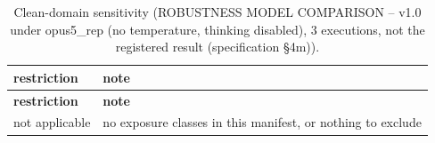\begingroup\footnotesize
\begin{longtable}{>{\raggedright\arraybackslash}p{126.4pt}>{\raggedright\arraybackslash}p{304.6pt}}
\caption{Clean-domain sensitivity (ROBUSTNESS MODEL COMPARISON -- v1.0 under opus5\_\allowbreak{}rep (no temperature, thinking disabled), 3 executions, not the registered result (specification §4m)).} \\
\toprule
\textbf{restriction} & \textbf{note} \\
\midrule
\endfirsthead
\toprule
\textbf{restriction} & \textbf{note} \\
\midrule
\endhead
\bottomrule
\endfoot
not applicable & no exposure classes in this manifest, or nothing to exclude \\
\end{longtable}
\endgroup
